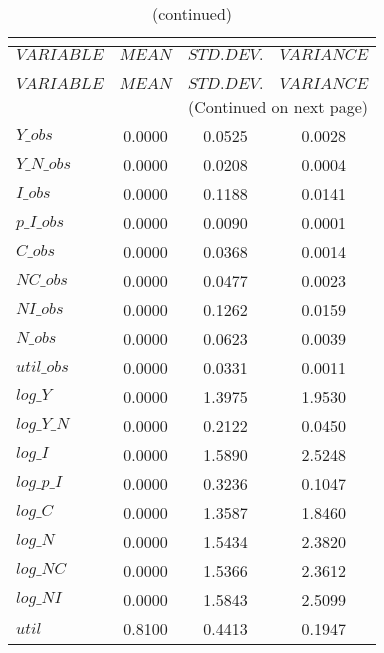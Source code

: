  
\begin{center}
\begin{longtable}{lccc} 
\caption{THEORETICAL MOMENTS}\\
 \label{Table:th_moments}\\
\toprule 
$VARIABLE   $	 & 	 $         MEAN$	 & 	 $    STD. DEV.$	 & 	 $     VARIANCE$\\
\midrule \endfirsthead 
\caption{(continued)}\\
 \toprule \\ 
$VARIABLE   $	 & 	 $         MEAN$	 & 	 $    STD. DEV.$	 & 	 $     VARIANCE$\\
\midrule \endhead 
\midrule \multicolumn{4}{r}{(Continued on next page)} \\ \bottomrule \endfoot 
\bottomrule \endlastfoot 
$Y\_obs     $	 & 	       0.0000	 & 	       0.0525	 & 	       0.0028 \\ 
$Y\_N\_obs  $	 & 	       0.0000	 & 	       0.0208	 & 	       0.0004 \\ 
$I\_obs     $	 & 	       0.0000	 & 	       0.1188	 & 	       0.0141 \\ 
$p\_I\_obs  $	 & 	       0.0000	 & 	       0.0090	 & 	       0.0001 \\ 
$C\_obs     $	 & 	       0.0000	 & 	       0.0368	 & 	       0.0014 \\ 
$NC\_obs    $	 & 	       0.0000	 & 	       0.0477	 & 	       0.0023 \\ 
$NI\_obs    $	 & 	       0.0000	 & 	       0.1262	 & 	       0.0159 \\ 
$N\_obs     $	 & 	       0.0000	 & 	       0.0623	 & 	       0.0039 \\ 
$util\_obs  $	 & 	       0.0000	 & 	       0.0331	 & 	       0.0011 \\ 
$log\_Y     $	 & 	       0.0000	 & 	       1.3975	 & 	       1.9530 \\ 
$log\_Y\_N  $	 & 	       0.0000	 & 	       0.2122	 & 	       0.0450 \\ 
$log\_I     $	 & 	       0.0000	 & 	       1.5890	 & 	       2.5248 \\ 
$log\_p\_I  $	 & 	       0.0000	 & 	       0.3236	 & 	       0.1047 \\ 
$log\_C     $	 & 	       0.0000	 & 	       1.3587	 & 	       1.8460 \\ 
$log\_N     $	 & 	       0.0000	 & 	       1.5434	 & 	       2.3820 \\ 
$log\_NC    $	 & 	       0.0000	 & 	       1.5366	 & 	       2.3612 \\ 
$log\_NI    $	 & 	       0.0000	 & 	       1.5843	 & 	       2.5099 \\ 
${util}     $	 & 	       0.8100	 & 	       0.4413	 & 	       0.1947 \\ 
\end{longtable}
 \end{center}
